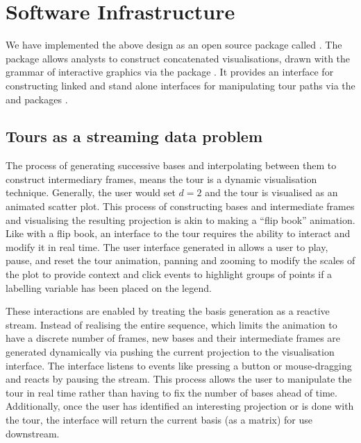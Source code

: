 \documentclass[article,notitle]{jdssv}
\begin{document}
\hypertarget{software-infrastructure}{%
\section{Software Infrastructure}\label{software-infrastructure}}

We have implemented the above design as an open source  package called
 \citep{r-liminal}. The package allows analysts to construct concatenated
visualisations, drawn with the  grammar of interactive graphics via
the  package \citep{Satyanarayan2017-gs, Lyttle2020-hp}. It provides
an interface for constructing linked and stand alone interfaces for
manipulating tour paths via the  and  packages
\citep{Chang2020-bq, Wickham2011-st}.

\hypertarget{tours-as-a-streaming-data-problem}{%
\subsection{Tours as a streaming data problem}\label{tours-as-a-streaming-data-problem}}

The process of generating successive bases and interpolating between them to\\
construct intermediary frames, means the tour is a dynamic visualisation
technique. Generally, the user would set \(d=2\) and the tour is visualised as
an animated scatter plot. This process of constructing bases and intermediate
frames and visualising the resulting projection is akin to making a ``flip book''
animation. Like with a flip book, an interface to the tour requires the ability
to interact and modify it in real time. The user interface generated in 
allows a user to play, pause, and reset the tour animation,
panning and zooming to modify the scales of the plot to provide context and
click events to highlight groups of points if a labelling variable has
been placed on the legend.

These interactions are enabled by treating the basis generation as a reactive
stream. Instead of realising the entire sequence, which limits the animation
to have a discrete number of frames, new bases and their intermediate frames
are generated dynamically via pushing the current projection to the
visualisation interface. The interface listens to events like pressing a button
or mouse-dragging and reacts by pausing the stream. This process allows the
user to manipulate the tour in real time rather than having to fix the number
of bases ahead of time. Additionally, once the user has identified an
interesting projection or is done with the tour, the interface will return the
current basis (as a matrix) for use downstream.
\end{document}
